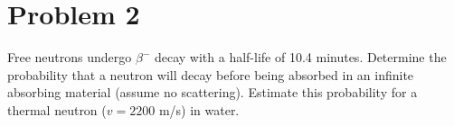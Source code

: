 \section*{Problem 2}

Free neutrons undergo $\beta^{-}$ decay with a half-life of 10.4 minutes. 
Determine the probability that a neutron will decay before being absorbed in an infinite absorbing material (assume no scattering). 
Estimate this probability for a thermal neutron ($v = 2200$ m/s) in water.

